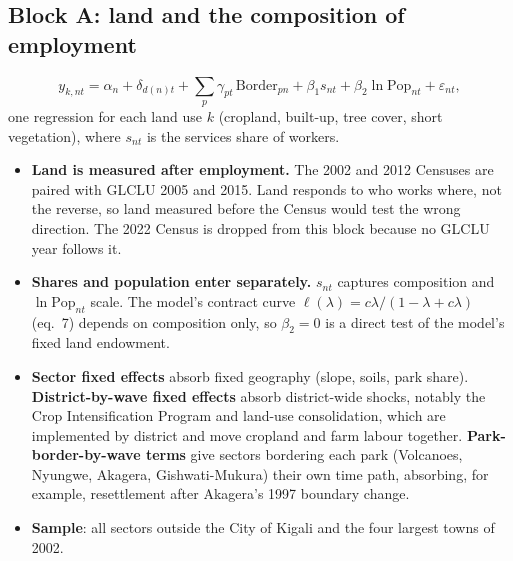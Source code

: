 \documentclass[11pt]{article}
\begin{document}
\subsection{Block A: land and the composition of employment}
\begin{equation*}
y_{k,nt}=\alpha_n+\delta_{d(n)t}+\textstyle\sum_p\gamma_{pt}\,\text{Border}_{pn}+\beta_1 s_{nt}+\beta_2\ln \text{Pop}_{nt}+\varepsilon_{nt},
\end{equation*}
one regression for each land use $k$ (cropland, built-up, tree cover, short vegetation), where $s_{nt}$ is the services share of workers.
\begin{itemize}
\item \textbf{Land is measured after employment.} The 2002 and 2012 Censuses are paired with GLCLU 2005 and 2015. Land responds to who works where, not the reverse, so land measured before the Census would test the wrong direction. The 2022 Census is dropped from this block because no GLCLU year follows it.
\item \textbf{Shares and population enter separately.} $s_{nt}$ captures composition and $\ln\text{Pop}_{nt}$ scale. The model's contract curve $\ell(\lambda)=c\lambda/(1-\lambda+c\lambda)$ (eq.\ 7) depends on composition only, so $\beta_2=0$ is a direct test of the model's fixed land endowment.
\item \textbf{Sector fixed effects} absorb fixed geography (slope, soils, park share). \textbf{District-by-wave fixed effects} absorb district-wide shocks, notably the Crop Intensification Program and land-use consolidation, which are implemented by district and move cropland and farm labour together. \textbf{Park-border-by-wave terms} give sectors bordering each park (Volcanoes, Nyungwe, Akagera, Gishwati-Mukura) their own time path, absorbing, for example, resettlement after Akagera's 1997 boundary change.
\item \textbf{Sample}: all sectors outside the City of Kigali and the four largest towns of 2002.
\end{itemize}
\end{document}
